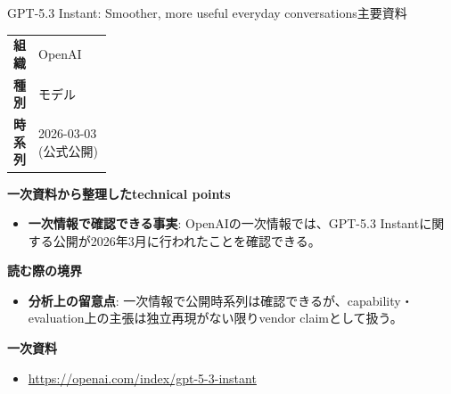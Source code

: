 \begin{technicalnote}{GPT-5.3 Instant: Smoother, more useful everyday conversations}{主要資料}
\begingroup
\begin{tabularx}{\linewidth}{@{}>{\bfseries}p{0.22\linewidth}X@{}}
組織 & OpenAI \\
種別 & モデル \\
時系列 & 2026-03-03 (公式公開) \\
\end{tabularx}
\smallskip
{\bfseries 一次資料から整理したtechnical points}
\begin{itemize}[leftmargin=1.5em,itemsep=0.35em]
\item \textbf{一次情報で確認できる事実}: OpenAIの一次情報では、GPT-5.3 Instantに関する公開が2026年3月に行われたことを確認できる。
\end{itemize}
\begin{minipage}{\linewidth}
{\bfseries 読む際の境界}
\begin{itemize}[leftmargin=1.5em,itemsep=0.35em]
\item \textbf{分析上の留意点}: 一次情報で公開時系列は確認できるが、capability・evaluation上の主張は独立再現がない限りvendor claimとして扱う。
\end{itemize}
\begin{samepage}
{\bfseries 一次資料}
\begingroup\sloppy
\begin{itemize}[leftmargin=1.5em,itemsep=0.25em]
\item {\scriptsize\url{https://openai.com/index/gpt-5-3-instant}}
\end{itemize}
\endgroup
\end{samepage}
\end{minipage}
\endgroup
\end{technicalnote}
\medskip

